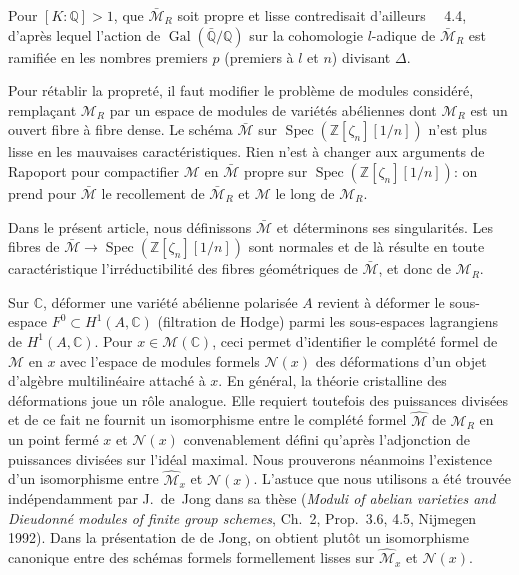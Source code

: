 \documentclass[11pt,a4paper]{article}
\theoremstyle{plain}
\theoremstyle{definition}
\DeclareMathOperator{\Spec}{Spec}
\DeclareMathOperator{\Gal}{Gal}
\begin{document}
Pour $[K : \mathbb{Q}] > 1$, que $\bar{\mathscr{M}}_R$ soit propre et lisse contredisait d'ailleurs
~\cite{HLR}~4.4, d'apr\`es lequel l'action de $\Gal(\bar{\mathbb{Q}}/\mathbb{Q})$ sur la cohomologie
$l$-adique de $\bar{\mathscr{M}}_R$ est ramifi\'ee en les nombres premiers $p$ (premiers \`a $l$ et $n$)
divisant $\Delta$.

Pour r\'etablir la propret\'e, il faut modifier le probl\`eme de modules consid\'er\'e,
rempla\c{c}ant $\mathscr{M}_R$ par un espace de modules de vari\'et\'es ab\'eliennes dont $\mathscr{M}_R$
est un ouvert fibre \`a fibre dense. Le sch\'ema $\bar{\mathscr{M}}$ sur $\Spec(\mathbb{Z}[\zeta_n][1/n])$ n'est plus
lisse en les mauvaises caract\'eristiques. Rien n'est \`a changer aux arguments de
Rapoport pour compactifier $\mathscr{M}$ en $\bar{\mathscr{M}}$ propre sur $\Spec(\mathbb{Z}[\zeta_n][1/n])$: on prend
pour $\bar{\mathscr{M}}$ le recollement de $\bar{\mathscr{M}}_R$ et $\mathscr{M}$ le long de $\mathscr{M}_R$.

Dans le pr\'esent article, nous d\'efinissons $\bar{\mathscr{M}}$ et d\'eterminons ses singularit\'es.
Les fibres de $\bar{\mathscr{M}} \to \Spec(\mathbb{Z}[\zeta_n][1/n])$ sont normales et de l\`a r\'esulte en toute
caract\'eristique l'irr\'eductibilit\'e des fibres g\'eom\'etriques de $\bar{\mathscr{M}}$, et donc de $\mathscr{M}_R$.

Sur $\mathbb{C}$, d\'eformer une vari\'et\'e ab\'elienne polaris\'ee $A$ revient \`a d\'eformer le
sous-espace $F^0 \subset H^1(A, \mathbb{C})$ (filtration de Hodge) parmi les sous-espaces lagrangiens
de $H^1(A, \mathbb{C})$. Pour $x \in \mathscr{M}(\mathbb{C})$, ceci permet d'identifier le compl\'et\'e formel de
$\mathscr{M}$ en $x$ avec l'espace de modules formels $\mathcal{N}(x)$ des d\'eformations d'un objet
d'alg\`ebre multilin\'eaire attach\'e \`a $x$. En g\'en\'eral, la th\'eorie cristalline des
d\'eformations joue un r\^ole analogue. Elle requiert toutefois des puissances
divis\'ees et de ce fait ne fournit un isomorphisme entre le compl\'et\'e formel $\hat{\mathscr{M}}$
de $\mathscr{M}_R$ en un point ferm\'e $x$ et $\mathcal{N}(x)$ convenablement d\'efini qu'apr\`es
l'adjonction de puissances divis\'ees sur l'id\'eal maximal. Nous prouverons
n\'eanmoins l'existence d'un isomorphisme entre $\hat{\mathscr{M}}_x$ et $\mathcal{N}(x)$. L'astuce que
nous utilisons a \'et\'e trouv\'ee ind\'ependamment par J.~de~Jong dans sa th\`ese
(\textit{Moduli of abelian varieties and Dieudonn\'e modules of finite group schemes},
Ch.~2, Prop.~3.6, 4.5, Nijmegen 1992). Dans la pr\'esentation de de Jong, on
obtient plut\^ot un isomorphisme canonique entre des sch\'emas formels formellement
lisses sur $\hat{\mathscr{M}}_x$ et $\mathcal{N}(x)$.
\end{document}
